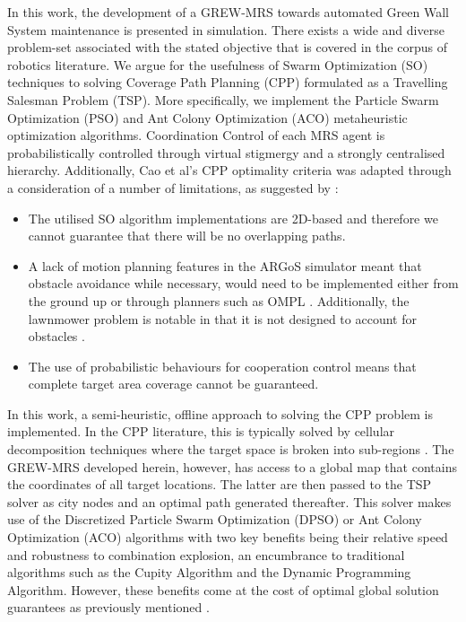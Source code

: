 \documentclass{report}
\begin{document}
In this work, the development of a GREW-MRS towards automated Green Wall System maintenance is presented in simulation. There exists a wide and diverse problem-set associated with the stated objective that is covered in the corpus of robotics literature. We argue for the usefulness of Swarm Optimization (SO) techniques to solving Coverage Path Planning (CPP) formulated as a Travelling Salesman Problem (TSP). More specifically, we implement the Particle Swarm Optimization (PSO) \cite{Kennedy1995} and Ant Colony Optimization (ACO) \cite{Dorigo1997} metaheuristic optimization algorithms. Coordination Control of each MRS agent is probabilistically controlled through virtual stigmergy and a strongly centralised hierarchy. Additionally, Cao et al's \cite{Cao1988} CPP optimality criteria was adapted through a consideration of a number of limitations, as suggested by \cite{Galceran2013}:
\begin{itemize}
	\item The utilised SO algorithm implementations are 2D-based and therefore we cannot guarantee that there will be no overlapping paths.
	\item A lack of motion planning features in the ARGoS simulator meant that obstacle avoidance while necessary, would need to be implemented either from the ground up or through planners such as OMPL \cite{OMPL}. Additionally, the lawnmower problem is notable in that it is not designed to account for obstacles \cite{Galceran2013}.
	\item The use of probabilistic behaviours for cooperation control means that complete target area coverage cannot be guaranteed.
\end{itemize}

In this work, a semi-heuristic, offline approach to solving the CPP problem is implemented. In the CPP literature, this is typically solved by cellular decomposition techniques where the target space is broken into sub-regions \cite{Choset2001}. The GREW-MRS developed herein, however, has access to a global map that contains the coordinates of all target locations. The latter are then passed to the TSP solver as city nodes and an optimal path generated thereafter. This solver makes use of the Discretized Particle Swarm Optimization (DPSO) or Ant Colony Optimization (ACO) algorithms with two key benefits being their relative speed and robustness to combination explosion, an encumbrance to traditional algorithms such as the Cupity Algorithm and the Dynamic Programming Algorithm. However, these benefits come at the cost of optimal global solution guarantees as previously mentioned \cite{Yan2012}.
\end{document}
